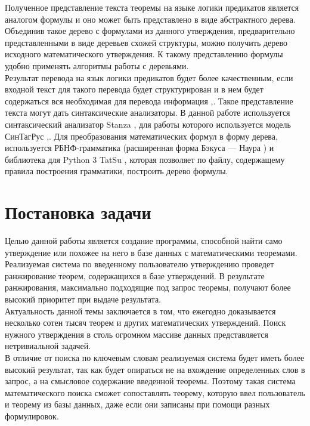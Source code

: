 \documentclass[12pt]{article}
\begin{document}
Полученное представление текста теоремы на языке логики предикатов является аналогом формулы и оно может быть представлено в виде абстрактного дерева. Объединив такое дерево с формулами из данного утверждения, предварительно представленными в виде деревьев схожей структуры,  можно получить дерево исходного математического утверждения. К такому представлению формулы удобно применять алгоритмы работы с деревьями.\\

Результат перевода на язык логики предикатов будет более качественным, если входной текст для такого перевода будет структурирован и в нем будет содержаться вся необходимая для перевода информация \cite{author11},\cite{author12}. Такое представление текста могут дать синтаксические анализаторы. В данной работе используется синтаксический анализатор Stanza \cite{author14}, для работы которого используется модель СинТагРус \cite{author17},\cite{apseyan}. Для преобразования математических формул в форму дерева, используется РБНФ-грамматика (расширенная форма Бэкуса — Наура \cite{author13}) и библиотека для Python 3 TatSu \cite{author16}, которая позволяет по файлу, содержащему правила построения грамматики, построить дерево формулы.

\newpage
\section*{Постановка задачи}

Целью данной работы является создание программы, способной найти само утверждение или похожее на него в базе данных с математическими теоремами.\\

Реализуемая система по введенному пользователю утверждению проведет ранжирование теорем, содержащихся в базе утверждений. В результате ранжирования,  максимально подходящие под запрос теоремы, получают более высокий приоритет при выдаче результата. \\

Актуальность данной темы заключается в том, что ежегодно доказывается несколько сотен тысяч теорем и других математических утверждений. Поиск нужного утверждения в столь огромном массиве данных представляется нетривиальной задачей.\\

В отличие от поиска по ключевым словам реализуемая система будет иметь более высокий результат, так как будет опираться не на вхождение определенных слов в запрос, а на смысловое содержание введенной теоремы. Поэтому такая система математического поиска сможет сопоставлять теорему, которую ввел пользователь и теорему из базы данных, даже если они записаны при помощи разных формулировок.  \\
\end{document}
